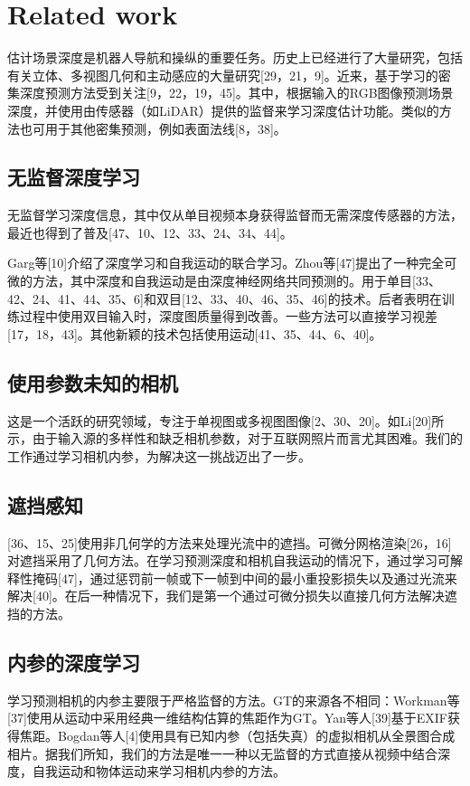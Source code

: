 \documentclass[10pt,journal,compsoc,UTF8]{IEEEtran}
\begin{document}
\section{Related work}
估计场景深度是机器人导航和操纵的重要任务。历史上已经进行了大量研究，包括有关立体、多视图几何和主动感应的大量研究[29，21，9]。近来，基于学习的密集深度预测方法受到关注[9，22，19，45]。其中，根据输入的RGB图像预测场景深度，并使用由传感器（如LiDAR）提供的监督来学习深度估计功能。类似的方法也可用于其他密集预测，例如表面法线[8，38]。

\subsection{无监督深度学习}
无监督学习深度信息，其中仅从单目视频本身获得监督而无需深度传感器的方法，最近也得到了普及[47、10、12、33、24、34、44]。

Garg等[10]介绍了深度学习和自我运动的联合学习。Zhou等[47]提出了一种完全可微的方法，其中深度和自我运动是由深度神经网络共同预测的。用于单目[33、42、24、41、44、35、6]和双目[12、33、40、46、35、46]的技术。后者表明在训练过程中使用双目输入时，深度图质量得到改善。一些方法可以直接学习视差[17，18，43]。其他新颖的技术包括使用运动[41、35、44、6、40]。

\subsection{使用参数未知的相机}
这是一个活跃的研究领域，专注于单视图或多视图图像[2、30、20]。如Li[20]所示，由于输入源的多样性和缺乏相机参数，对于互联网照片而言尤其困难。我们的工作通过学习相机内参，为解决这一挑战迈出了一步。

\subsection{遮挡感知}
[36、15、25]使用非几何学的方法来处理光流中的遮挡。可微分网格渲染[26，16]对遮挡采用了几何方法。在学习预测深度和相机自我运动的情况下，通过学习可解释性掩码[47]，通过惩罚前一帧或下一帧到中间的最小重投影损失以及通过光流来解决[40]。在后一种情况下，我们是第一个通过可微分损失以直接几何方法解决遮挡的方法。

\subsection{内参的深度学习}
学习预测相机的内参主要限于严格监督的方法。GT的来源各不相同：Workman等[37]使用从运动中采用经典一维结构估算的焦距作为GT。Yan等人[39]基于EXIF获得焦距。Bogdan等人[4]使用具有已知内参（包括失真）的虚拟相机从全景图合成相片。据我们所知，我们的方法是唯一一种以无监督的方式直接从视频中结合深度，自我运动和物体运动来学习相机内参的方法。
\end{document}

